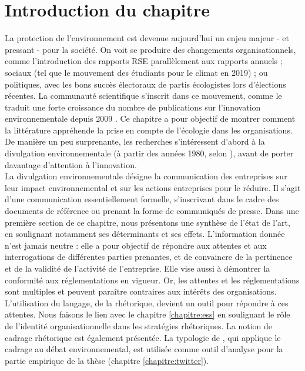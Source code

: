 
\section*{Introduction du chapitre}

La protection de l'environnement est devenue aujourd'hui un enjeu majeur - et pressant - pour la société. On voit se produire des changements organisationnels, comme l'introduction des rapports RSE parallèlement aux rapports annuels ; sociaux (tel que le mouvement des étudiants pour le climat en 2019) ; ou politiques, avec les bons succès électoraux de partis écologistes lors d'élections récentes. La communauté scientifique s'inscrit dans ce mouvement, comme le traduit une forte croissance du nombre de publications sur l'innovation environnementale depuis 2009 \parencite{diaz-garcia2015eco-innovation:}. Ce chapitre a pour objectif de montrer comment la littérature appréhende la prise en compte de l'écologie dans les organisations. De manière un peu surprenante, les recherches s'intéressent d'abord à la divulgation environnementale (à partir des années 1980, selon \textcite{ali2017determinants}), avant de porter davantage d'attention à l'innovation. \\

La divulgation environnementale désigne la communication des entreprises sur leur impact environnemental et sur les actions entreprises pour le réduire. Il s'agit d'une communication essentiellement formelle, s'inscrivant dans le cadre des documents de référence ou prenant la forme de communiqués de presse. Dans une première section de ce chapitre, nous présentons une synthèse de l'état de l'art, en soulignant notamment ses déterminants et ses effets. L'information donnée n'est jamais neutre : elle a pour objectif de répondre aux attentes et aux interrogations de différentes parties prenantes, et de convaincre de la pertinence et de la validité de l'activité de l'entreprise. Elle vise aussi à démontrer la conformité aux réglementations en vigueur. Or, les attentes et les réglementations sont multiples et peuvent paraître contraires aux intérêts des organisations. L'utilisation du langage, de la rhétorique, devient un outil pour répondre à ces attentes. Nous faisons le lien avec le chapitre \ref{chapitre:ess} en soulignant le rôle de l'identité organisationnelle dans les stratégies rhétoriques. La notion de cadrage rhétorique est également présentée. La typologie de \textcite{nisbet2010framing, nisbet2009communicating}, qui applique le cadrage au débat environnemental, est utilisée comme outil d'analyse pour la partie empirique de la thèse (chapitre \ref{chapitre:twitter}). \\


